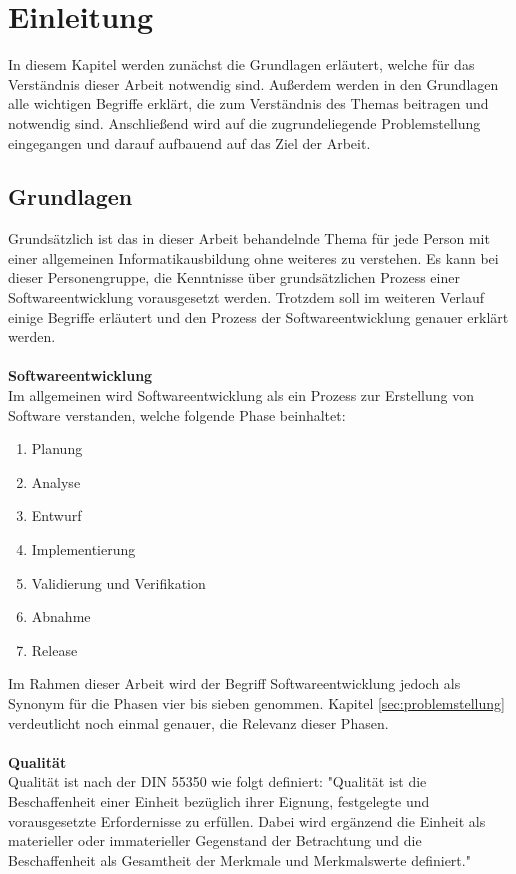 \chapter{Einleitung}
\label{chap:einleitung}
In diesem Kapitel werden zunächst die Grundlagen erläutert, welche für das Verständnis dieser Arbeit notwendig sind. Außerdem werden in den Grundlagen alle wichtigen Begriffe erklärt, die zum Verständnis des Themas beitragen und notwendig sind. Anschließend wird auf die zugrundeliegende Problemstellung eingegangen und darauf aufbauend auf das Ziel der Arbeit.

\section{Grundlagen}
\label{sec:grundlagen}
Grundsätzlich ist das in dieser Arbeit behandelnde Thema für jede Person mit einer allgemeinen Informatikausbildung ohne weiteres zu verstehen. Es kann bei dieser Personengruppe, die Kenntnisse über grundsätzlichen Prozess einer Softwareentwicklung vorausgesetzt werden. Trotzdem soll im weiteren Verlauf einige Begriffe erläutert und den Prozess der Softwareentwicklung genauer erklärt werden.
\\\\
\textbf{Softwareentwicklung}\\
Im allgemeinen wird Softwareentwicklung als ein Prozess zur Erstellung von Software verstanden, welche folgende Phase beinhaltet:
\begin{enumerate}
	\item Planung
	\item Analyse
	\item Entwurf
	\item Implementierung
	\item Validierung und Verifikation
	\item Abnahme
	\item Release
\end{enumerate}
Im Rahmen dieser Arbeit wird der Begriff Softwareentwicklung jedoch als Synonym für die Phasen vier bis sieben genommen. Kapitel \ref{sec:problemstellung}  verdeutlicht noch einmal genauer, die Relevanz dieser Phasen.
\\\\
\textbf{Qualität}\\
Qualität ist nach der DIN 55350 wie folgt definiert: "Qualität ist die Beschaffenheit einer Einheit bezüglich ihrer Eignung, festgelegte und vorausgesetzte Erfordernisse zu erfüllen. Dabei wird ergänzend die Einheit als materieller oder immaterieller Gegenstand der Betrachtung und die Beschaffenheit als Gesamtheit der Merkmale und Merkmalswerte definiert."
